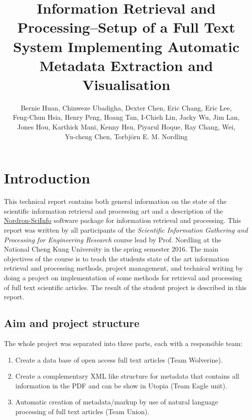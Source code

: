 \documentclass[a4paper,twocolumn,twoside]{article}
\begin{document}
 
	
	\title{Information Retrieval and Processing--Setup of a Full Text System Implementing Automatic Metadata Extraction and Visualisation}
	\author{Bernie Huan, Chinweze Ubadigha, Dexter Chen, Eric Chang, Eric Lee, \\
		Feng-Chun Hsia, Henry Peng, Hoang Tan, I-Chieh Lin, Jacky Wu, Jim Lan, \\
		Jones Hou, Karthick Mani, Kenny Hsu, Piyarul Hoque, Ray Chang, Wei, \\
		Yu-cheng Chen, Torbjörn E. M. Nordling}  %
	\maketitle   
	
	\section{Introduction}
	\label{Introduction}
	
	This technical report contains both general information on the state of the scientific information retrieval and processing art and a description of the \href{https://bitbucket.org/nordron/nordron-sciinfo}{Nordron-SciInfo} software package for information retrieval and processing. 
	This report was written by all participants of the \emph{Scientific Information Gathering and Processing for Engineering Research} course lead by Prof. Nordling at the National Cheng Kung University in the spring semester 2016. The main objectives of the course is to teach the students state of the art information retrieval and processing methods, project management, and technical writing by doing a project on implementation of some methods for retrieval and processing of full text scientific articles. The result of the student project is described in this report.
	
	\subsection{Aim and project structure}
	\label{aim}

	The whole project was separated into three parts, each with a responsible team:
	\begin{enumerate}
		\item Create a data base of open access full text articles (Team Wolverine).
		\item Create a complementary XML like structure for metadata that contains all information in the PDF and can be show in Utopia (Team Eagle unit).
		\item Automatic creation of metadata/markup by use of natural language processing of full text articles (Team Union).
	\end{enumerate}
	
\end{document}
